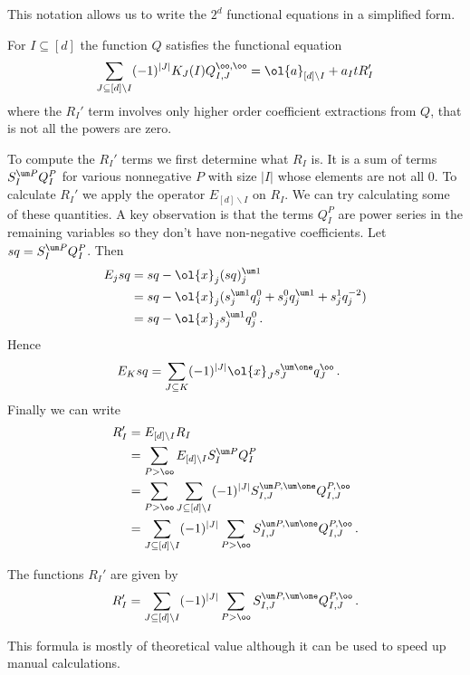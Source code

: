  This notation allows us to write the $2^d$ functional equations in a simplified form.
\begin{corollary} For $I \subseteq [d]$ the function $Q$ satisfies the functional equation
\begin{align}
	\sum_{J \subseteq [d]\backslash I}  (-1)^{|J|}K_J (I) Q_{I,J}^{\oo,\oo} = \ol{a}_{[d]\backslash I}+a_I t  R_I'
\end{align}
where the $R_I'$ term involves only higher order coefficient extractions from $Q$, that is not all the powers are zero.
\end{corollary}
To compute the $R_I'$ terms we first determine what $R_I$ is. It is a sum of terms $S_I^{\um P} Q_I^{P}$ for various nonnegative $P$ with size $|I|$ whose elements are not all 0. To calculate $R_I'$ we apply the operator $E_{[d]\backslash I}$ on $R_I$. We can try calculating some of these quantities. A key observation is that the terms $Q_I^P$ are power series in the remaining variables so they don't have non-negative coefficients. Let $sq = S_I^{\um P} Q_I^{P}$. Then
\begin{align}\begin{split}
	E_j sq &= sq - \ol{x}_j(sq)_j^{\um 1} \\ 
	&= sq - \ol{x}_j(s_j^{\um 1}q_j^0+s_j^{0}q_j^{\um 1}+s_j^{1}q_j^{-2})\\
	& = sq - \ol{x}_js_j^{\um 1}q_j^0\,.
\end{split}\end{align}
Hence
\begin{align}
	E_{K} sq &= \sum_{J\subseteq K} (-1)^{|J|}\ol{x}_J s_J^{\um \one} q_J^\oo\,.
\end{align}
Finally we can write
\begin{align}\begin{split}
	R_I' &= E_{[d]\backslash I} R_I \\
	& = \sum_{P > \oo} E_{[d]\backslash I}S_I^{\um P}Q_I^P\\
	& = \sum_{P > \oo} \sum_{J \subseteq [d]\backslash I} (-1)^{|J|} S_{I,J}^{\um P,\um \one}Q_{I,J}^{P,\oo}\\
	& = \sum_{J \subseteq [d]\backslash I}(-1)^{|J|}\sum_{P > \oo} S_{I,J}^{\um P,\um \one}Q_{I,J}^{P,\oo}\,.
\end{split}\end{align}
\begin{prop} The functions $R_I'$ are given by
\begin{align}
	R_I' =  \sum_{J \subseteq [d]\backslash I}(-1)^{|J|}\sum_{P > \oo} S_{I,J}^{\um P,\um \one}Q_{I,J}^{P,\oo}\,.
\end{align}
\end{prop}
This formula is mostly of theoretical value although it can be used to speed up manual calculations.
